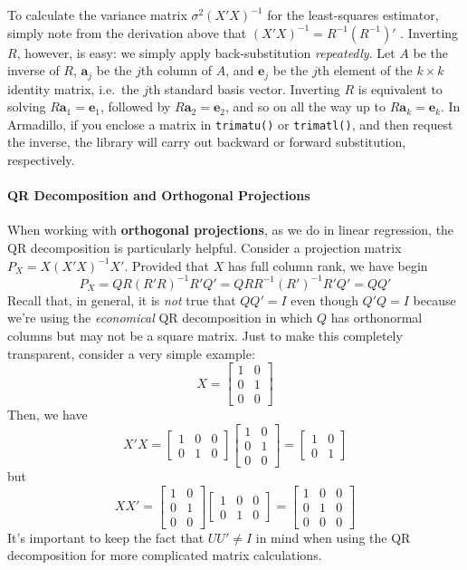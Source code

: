 To calculate the variance matrix $\sigma^2 (X'X)^{-1}$ for the least-squares estimator, simply note from the derivation above that $(X'X)^{-1} = R^{-1} (R^{-1})'$ .
Inverting $R$, however, is easy: we simply apply back-substitution \emph{repeatedly}.
Let $A$ be the inverse of $R$, $\mathbf{a}_j$ be the $j$th column of $A$, and $\mathbf{e}_j$ be the $j$th element of the $k\times k$ identity matrix, i.e.\ the $j$th standard basis vector.
Inverting $R$ is equivalent to solving $R \mathbf{a}_1 = \mathbf{e}_1$, followed by $R \mathbf{a}_2 = \mathbf{e}_2$, and so on all the way up to $R \mathbf{a}_k = \mathbf{e}_k$.
In Armadillo, if you enclose a matrix in \texttt{trimatu()} or \texttt{trimatl()}, and then request the inverse, the library will carry out backward or forward substitution, respectively.

\paragraph{QR Decomposition and Orthogonal Projections}
When working with \textbf{orthogonal projections}, as we do in linear regression, the QR decomposition is particularly helpful.
Consider a projection matrix $P_X = X (X'X)^{-1}X'$. Provided that $X$ has full column rank, we have
begin
  $$P_X  = QR(R'R)^{-1}R'Q' = QRR^{-1} (R')^{-1}R'Q' = QQ'$$
Recall that, in general, it is \emph{not} true that $QQ' = I$ even though $Q'Q = I$ because we're using the \emph{economical} QR decomposition in which $Q$ has orthonormal columns but may not be a square matrix.
Just to make this completely transparent, consider a very simple example:
	$$X = \left[ \begin{array}
		{cc} 1 & 0 \\ 0 & 1 \\ 0 & 0
	\end{array}\right]$$
Then, we have
	$$X'X = \left[\begin{array}
		{ccc} 1& 0 & 0 \\ 0 & 1 & 0
	\end{array} \right]\left[ \begin{array}
		{cc} 1 & 0 \\ 0 & 1 \\ 0 & 0
	\end{array}\right] = \left[\begin{array}
		{cc} 1 & 0 \\ 0 & 1
	\end{array} \right]$$
but 
	$$XX' = \left[ \begin{array}
		{cc} 1 & 0 \\ 0 & 1 \\ 0 & 0
	\end{array}\right]\left[\begin{array}
		{ccc} 1& 0 & 0 \\ 0 & 1 & 0
	\end{array} \right] = \left[\begin{array}
		{ccc} 1 & 0 & 0 \\ 0 & 1 & 0 \\ 0 & 0 & 0
	\end{array} \right]$$
It's important to keep the fact that $UU' \neq I$ in mind when using the QR decomposition for more complicated matrix calculations.

